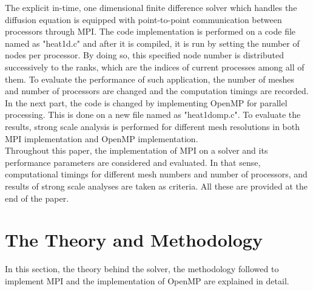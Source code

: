 \documentclass{article}
\begin{document}
The explicit in-time, one dimensional finite difference solver which handles the diffusion equation is equipped with point-to-point communication between processors through MPI. The code implementation is performed on a code file named as "heat1d.c" and after it is compiled, it is run by setting the number of nodes per processor. By doing so, this specified node number is distributed successively to the ranks, which are the indices of current processes among all of them. To evaluate the performance of such application, the number of meshes and number of processors are changed and the computation timings are recorded. \\

In the next part, the code is changed by implementing OpenMP for parallel processing. This is done on a new file named as "heat1d\textunderscore omp.c". To evaluate the results, strong scale analysis is performed for different mesh resolutions in both MPI implementation and OpenMP implementation. \\

Throughout this paper, the implementation of MPI on a solver and its performance parameters are considered and evaluated. In that sense, computational timings for different mesh numbers and number of processors, and results of strong scale analyses are taken as criteria. All these are provided at the end of the paper. 

\clearpage

\section{The Theory and Methodology}
In this section, the theory behind the solver, the methodology followed to implement MPI and the implementation of OpenMP are explained in detail. 
\end{document}
